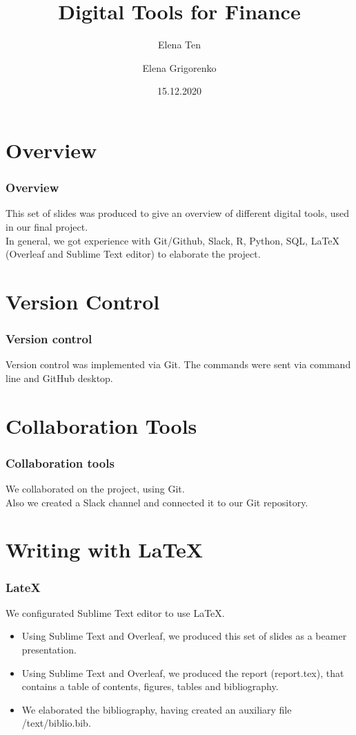 \documentclass {beamer}
\title{Digital Tools for Finance}
\author [Ten, Grigorenko] {Elena Ten \and Elena Grigorenko}
\institute [UZH] {University of Zurich}
\date {15.12.2020}
\begin{document}
\frame{\titlepage}

\section{Overview}
\begin{frame}
\frametitle{Overview}
This set of slides was produced to give an overview of different digital tools, used in our final project.\\
In general, we got experience with Git/Github, Slack, R, Python, SQL, LaTeX (Overleaf and Sublime Text editor) to elaborate the project. 

\end{frame}



\section{Version Control}
\begin{frame}
\frametitle{Version control}
Version control was implemented via Git. The commands were sent via command line and GitHub desktop.

\end{frame}


\section{Collaboration Tools}
\begin{frame}
\frametitle{Collaboration tools}
We collaborated on the project, using Git.\\
Also we created a Slack channel and connected it to our Git repository.

\end{frame}


\section{Writing with LaTeX}
\begin{frame}
\frametitle{LateX}
We configurated Sublime Text editor to use LaTeX.\\
\begin{itemize}
\item Using Sublime Text and Overleaf, we produced this set of slides as a beamer presentation.
\item Using Sublime Text and Overleaf, we produced the report (report.tex), that contains a table of contents, figures, tables and bibliography.
\item We elaborated the bibliography, having created an auxiliary file /text/biblio.bib.
\end{itemize}

\end{frame}
\end{document}
